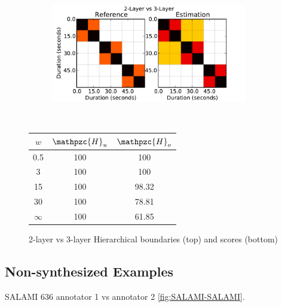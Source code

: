 \documentclass{article}
\begin{document}
\begin{figure}
  \centering
  \begin{subfigure}{0.5\textwidth}
    \centering
    \includegraphics[width=0.94\textwidth]{plots/hier-hiercomp.pdf}
  \end{subfigure}%
  \\
  \begin{minipage}{0.5\textwidth}
    \centering
    \vspace{10pt}
    \begin{tabular}{|c|c|c|}
      \hline
      $w$       & $\mathpzc{H}_u$       & $\mathpzc{H}_o$      \\
      \hline
      0.5       & 100       & 100      \\     
      3         & 100       & 100      \\
      15        & 100       & 98.32    \\
      30        & 100       & 78.81    \\
      $\infty$  & 100       & 61.85    \\
      \hline
    \end{tabular}
  \end{minipage}
  \caption{2-layer vs 3-layer Hierarchical boundaries (top) and scores (bottom)}
  \label{fig:hier-hiercomp}
\end{figure}


\subsection{Non-synthesized Examples}

SALAMI 636 annotator 1 vs annotator 2 \ref{fig:SALAMI-SALAMI}.
\end{document}
